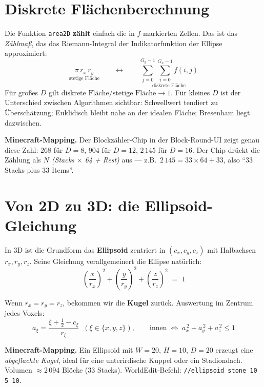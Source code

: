 \documentclass[12pt,a4paper]{scrartcl}
\newcommand{\code}[1]{\texttt{\small #1}}
\newcommand{\acc}[1]{\textcolor{accent}{\textbf{#1}}}
\newcommand{\cmd}[1]{\textcolor{earth}{\texttt{\small #1}}}
\begin{document}
\section{Diskrete Flächenberechnung}

Die Funktion \code{area2D} \acc{zählt} einfach die in $f$ markierten Zellen. Das ist das \emph{Zählmaß}, das das Riemann-Integral der Indikatorfunktion der Ellipse approximiert:
\[
\underset{\text{stetige Fläche}}{\pi \, r_x \, r_y}
\qquad\longleftrightarrow\qquad
\underset{\text{diskrete Fläche}}{\sum_{j=0}^{G_y-1}\sum_{i=0}^{G_x-1} f(i,j)}
\]
Für großes $D$ gilt $\text{diskrete Fläche} / \text{stetige Fläche} \to 1$. Für kleines $D$ ist der Unterschied zwischen Algorithmen sichtbar: Schwellwert tendiert zu Überschätzung; Euklidisch bleibt nahe an der idealen Fläche; Bresenham liegt dazwischen.

\begin{minec}
\textbf{Minecraft-Mapping.} Der Blockzähler-Chip in der Block-Round-UI zeigt genau diese Zahl: $268$ für $D=8$, $904$ für $D=12$, $2\,145$ für $D=16$. Der Chip drückt die Zählung als \emph{$N$ (Stacks $\times$ 64 + Rest)} aus --- z.B.\ $2\,145 = 33 \times 64 + 33$, also \enquote{$33$ Stacks plus $33$ Items}.
\end{minec}

\section{Von 2D zu 3D: die Ellipsoid-Gleichung}

In 3D ist die Grundform das \acc{Ellipsoid} zentriert in $(c_x, c_y, c_z)$ mit Halbachsen $r_x, r_y, r_z$. Seine Gleichung verallgemeinert die Ellipse natürlich:
\[
\left(\dfrac{x}{r_x}\right)^{\!2} + \left(\dfrac{y}{r_y}\right)^{\!2} + \left(\dfrac{z}{r_z}\right)^{\!2} \;=\; 1
\]

Wenn $r_x = r_y = r_z$, bekommen wir die \acc{Kugel} zurück. Auswertung im Zentrum jedes Voxels:
\[
a_\xi = \frac{\xi + \tfrac{1}{2} - c_\xi}{r_\xi}\;\;(\xi \in \{x,y,z\}),
\qquad
\text{innen}\;\Longleftrightarrow\;a_x^{\,2} + a_y^{\,2} + a_z^{\,2} \leq 1
\]

\begin{minec}
\textbf{Minecraft-Mapping.} Ein Ellipsoid mit $W=20$, $H=10$, $D=20$ erzeugt eine \emph{abgeflachte Kugel}, ideal für eine unterirdische Kuppel oder ein Stadiondach. Volumen $\approx 2\,094$ Blöcke ($33$ Stacks). WorldEdit-Befehl: \cmd{//ellipsoid stone 10 5 10}.
\end{minec}
\end{document}
